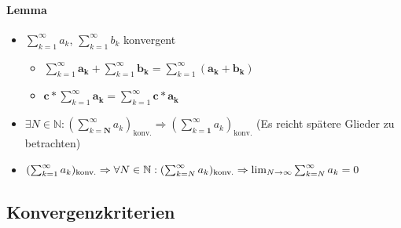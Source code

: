 \paragraph{Lemma}

\begin{itemize}
      \item $\sum_{k=1}^\infty a_k$, $\sum_{k=1}^\infty b_k$ konvergent
            \begin{itemize}
                  \item $\sum_{k=1}^\infty \mathbf{a_k} + \sum_{k=1}^\infty \mathbf{b_k} = \sum_{k=1}^\infty (\mathbf{a_k + b_k})$
                  \item $\mathbf{c *} \sum_{k=1}^\infty \mathbf{a_k} = \sum_{k=1}^\infty \mathbf{c * a_k}$
            \end{itemize}

      \item $\exists N \in \mathbb{N}: (\sum_{k=\boldsymbol{N}}^\infty a_k)_\text{konv.} \Rightarrow (\sum_{k=\boldsymbol{1}}^\infty a_k)_\text{konv.}$ (Es reicht spätere Glieder zu betrachten)

      \item $(\sum_{k=1}^\infty a_k)_\text{konv.} \linebreak \Rightarrow \forall N \in \mathbb{N}: (\sum_{k=N}^\infty a_k)_\text{konv.} \linebreak \Rightarrow \lim_{N \rightarrow \infty} \sum_{k=N}^\infty a_k = 0$
\end{itemize}

\subsection{Konvergenzkriterien}

